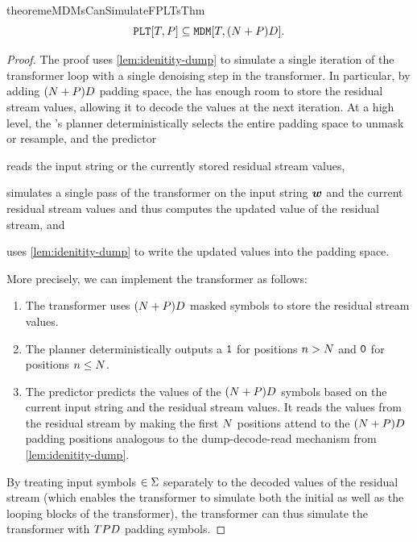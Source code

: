 \begin{restatable}{theorem}{eMDMsCanSimulateFPLTsThm} \label{thm:emdms-can-simulate-fplts}
   \begin{equation}
      {\mathtt{PLT}}[{T}, {P}] \subseteq {\mathtt{MDM}}[{T}, ({{N}} + {P}) {{D}}].
   \end{equation}
\end{restatable}
\begin{proof}
   The proof uses \cref{lem:idenitity-dump} to simulate a single iteration of the \LTAcr transformer loop with a single denoising step in the \MDMAcr transformer.
   In particular, by adding $({{N}} + {P}) {{D}}$ padding space, the \MDMAcr has enough room to store the residual stream values, allowing it to decode the values at the next iteration.
   At a high level, the \MDMAcr's planner deterministically selects the entire padding space to unmask or resample, and the predictor
   \begin{enumerate*}[label=\textit{(\arabic*)}]
      \item reads the input string or the currently stored residual stream values,
      \item simulates a single pass of the \LTAcr transformer on the input string ${{\boldsymbol{w}}}$ and the current residual stream values and thus computes the updated value of the residual stream, and
      \item uses \cref{lem:idenitity-dump} to write the updated values into the padding space.
   \end{enumerate*}
   
   More precisely, we can implement the \MDMAcr transformer as follows:
   \begin{enumerate}[label=(\arabic*)]
      \item The \MDMAcr transformer uses $({{N}} + {P}) {{D}}$ masked symbols to store the residual stream values.
      \item The planner deterministically outputs a ${\texttt{1}}$ for positions ${{n}} > {{N}}$ and ${\texttt{0}}$ for positions ${{n}} \leq {{N}}$.
      \item The predictor predicts the values of the $({{N}} + {P}) {{D}}$ symbols based on the current input string and the residual stream values.
      It reads the values from the residual stream by making the first ${{N}}$ positions attend to the $({{N}} + {P}) {{D}}$ padding positions analogous to the dump-decode-read mechanism from \cref{lem:idenitity-dump}.
   \end{enumerate}
   
   By treating input symbols $\in {{\Sigma}}$ separately to the decoded values of the residual stream (which enables the \MDMAcr transformer to simulate both the initial as well as the looping blocks of the \LTAcr transformer), the \MDMAcr transformer can thus simulate the \LTAcr transformer with ${T} {P} {{D}}$ padding symbols.
\end{proof}

